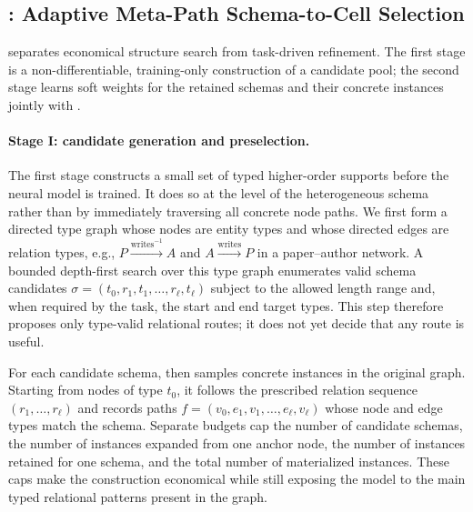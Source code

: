 \subsection{\ampss{}: Adaptive Meta-Path Schema-to-Cell Selection}
\label{sec:ampss}

\ampss{} separates economical structure search from task-driven refinement.  The first stage is a
non-differentiable, training-only construction of a candidate pool; the second stage learns soft
weights for the retained schemas and their concrete instances jointly with \method{}.

\paragraph{Stage I: candidate generation and preselection.}
The first stage constructs a small set of typed higher-order supports before the neural model is
trained.  It does so at the level of the heterogeneous schema rather than by immediately traversing
all concrete node paths.  We first form a directed type graph whose nodes are entity types and whose
directed edges are relation types, e.g., \(P\xrightarrow{\mathrm{writes}^{-1}}A\) and
\(A\xrightarrow{\mathrm{writes}}P\) in a paper--author network.  A bounded depth-first search over
this type graph enumerates valid schema candidates
\(\sigma=(t_0,r_1,t_1,\ldots,r_\ell,t_\ell)\) subject to the allowed length range and, when
required by the task, the start and end target types.  This step therefore proposes only type-valid
relational routes; it does not yet decide that any route is useful.

For each candidate schema, \ampss{} then samples concrete instances in the original graph.  Starting
from nodes of type \(t_0\), it follows the prescribed relation sequence
\((r_1,\ldots,r_\ell)\) and records paths
\(f=(v_0,e_1,v_1,\ldots,e_\ell,v_\ell)\) whose node and edge types match the schema.  Separate
budgets cap the number of candidate schemas, the number of instances expanded from one anchor node,
the number of instances retained for one schema, and the total number of materialized instances.
These caps make the construction economical while still exposing the model to the main typed
relational patterns present in the graph.

